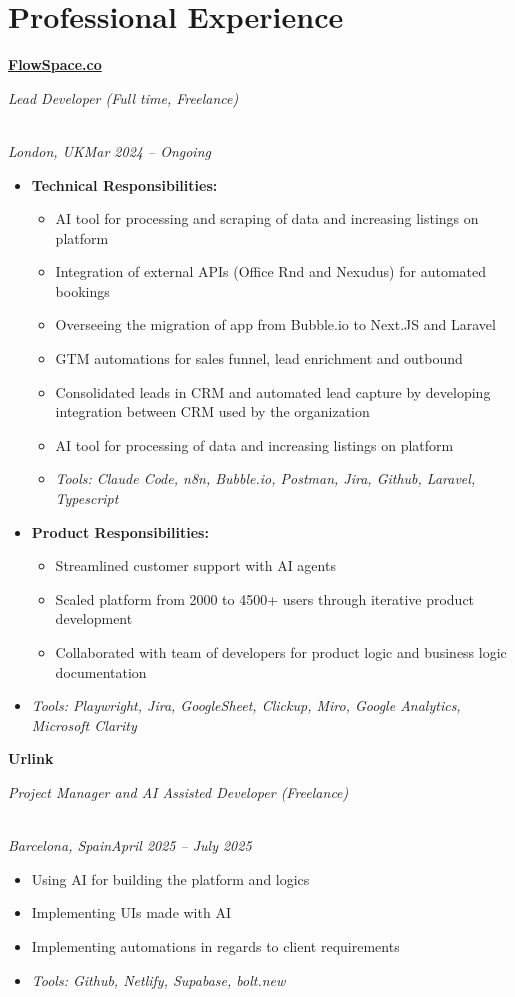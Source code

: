 \documentclass[a4paper,10pt]{article}
\newcommand{\role}[4]{\vspace{3pt}\noindent\hspace{0.6em}\parbox[t]{0.38\textwidth}{\raggedright\textbf{#1}}\hfill\parbox[t]{0.58\textwidth}{\raggedleft\textit{#2}}\\{\textit{#3}\hfill\textit{#4}}\vspace{1pt}}
\begin{document}
\section{Professional Experience}
\role{\href{https://flowspace.co}{FlowSpace.co}}{Lead Developer (Full time, Freelance)}{London, UK}{Mar 2024 -- Ongoing}
\begin{itemize}
\item \textbf{Technical Responsibilities:}
\begin{itemize}[label=--]
\item AI tool for processing and scraping of data and increasing listings on platform
\item Integration of external APIs (Office Rnd and Nexudus) for automated bookings
\item Overseeing the migration of app from Bubble.io to Next.JS and Laravel
\item GTM automations for sales funnel, lead enrichment and outbound
\item Consolidated leads in CRM and automated lead capture by developing integration between CRM used by the organization
\item AI tool for processing of data and increasing listings on platform
\item \textit{Tools: Claude Code, n8n, Bubble.io, Postman, Jira, Github, Laravel, Typescript}
\end{itemize}
\item \textbf{Product Responsibilities:}
\begin{itemize}[label=--]
\item Streamlined customer support with AI agents
\item Scaled platform from 2000 to 4500+ users through iterative product development
\item Collaborated with team of developers for product logic and business logic documentation
\end{itemize}
\item \textit{Tools: Playwright, Jira, GoogleSheet, Clickup, Miro, Google Analytics, Microsoft Clarity}
\end{itemize}

\role{Urlink}{Project Manager and AI Assisted Developer (Freelance)}{Barcelona, Spain}{April 2025 -- July 2025}
\begin{itemize}
\item Using AI for building the platform and logics
\item Implementing UIs made with AI
\item Implementing automations in regards to client requirements
\item \textit{Tools: Github, Netlify, Supabase, bolt.new}
\end{itemize}
\end{document}
